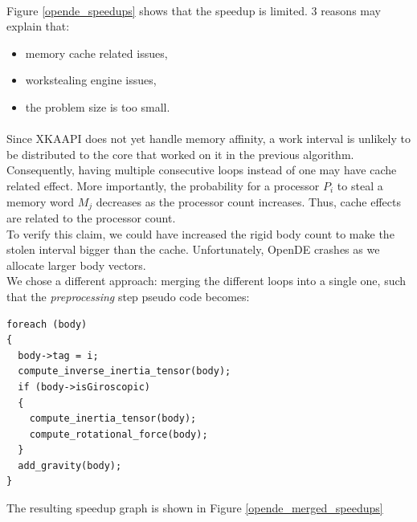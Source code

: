 \documentclass[a4paper, 11pt]{article}
\begin{document}
\paragraph{}
Figure \ref{opende_speedups} shows that the speedup is limited. 3 reasons may explain that:
\begin{itemize}
  \item memory cache related issues,
  \item workstealing engine issues,
  \item the problem size is too small.
\end{itemize}

\paragraph{}
Since XKAAPI does not yet handle memory affinity, a work interval is unlikely to be distributed to the core
that worked on it in the previous algorithm. Consequently, having multiple consecutive loops instead of one
may have cache related effect. More importantly, the probability for a processor $P_i$ to steal a memory word
$M_j$ decreases as the processor count increases. Thus, cache effects are related to the processor count.\\
To verify this claim, we could have increased the rigid body count to make the stolen interval bigger than
the cache. Unfortunately, OpenDE crashes as we allocate larger body vectors.\\
We chose a different approach: merging the different loops into a single one, such that the \textit{preprocessing}
step pseudo code becomes:\\
\begin{small}
\lstset{language=C}
\begin{lstlisting}[frame=tb]
foreach (body)
{
  body->tag = i;
  compute_inverse_inertia_tensor(body);
  if (body->isGiroscopic)
  {
    compute_inertia_tensor(body);
    compute_rotational_force(body);
  }
  add_gravity(body);
}
\end{lstlisting}
\end{small}
The resulting speedup graph is shown in Figure \ref{opende_merged_speedups}
\end{document}
